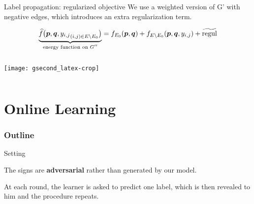 \documentclass[10pt,svgnames,ignorenonframetext,final]{beamer}
\begin{document}
\begin{frame}{Label propagation: regularized objective}
  We use a weighted version of G' with negative edges, which introduces an extra regularization
  term.


  \vspace{-5mm}
\begin{equation*}
  \underbrace{ \widehat{f}\big(\boldsymbol{p},\boldsymbol{q},{y_{i,j}}_{(i,j) \in E\setminus E_0}\big)}_{\text{energy
  function on $G''$}} =
  f_{E_0}(\boldsymbol{p},\boldsymbol{q}) + f_{E\setminus E_0}(\boldsymbol{p},\boldsymbol{q}, {y_{i,j}}) + \widetilde{\mathrm{regul}}
\end{equation*}

\begin{columns}
\begin{column}{0.6\textwidth}
  \begin{center}
  \vspace{-5mm}
   \texttt{[image: gsecond\_latex-crop]}
  \end{center}
\end{column}
\begin{column}{0.4\textwidth}  %
\end{column}
\end{columns}
\end{frame}

\section{Online Learning}\label{online-learning}
  \begin{frame} \frametitle{Outline} \tableofcontents[currentsection] \end{frame}

\begin{frame}{Setting}

The signs are \textbf{adversarial} rather than generated by our model.

At each round, the learner is asked to predict one label, which is then revealed to him and the
procedure repeats.

\end{frame}
\end{document}
